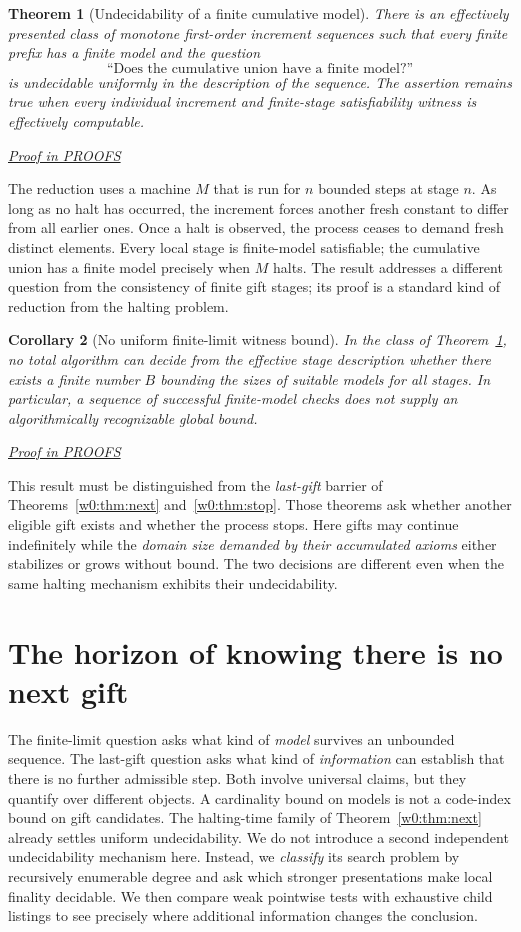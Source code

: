 \documentclass[11pt,letterpaper]{article}
\newtheorem{theorem}{Theorem}[section]
\newtheorem{corollary}[theorem]{Corollary}
\theoremstyle{definition}\newtheorem{definition}[theorem]{Definition}\newtheorem{example}[theorem]{Example}
\theoremstyle{remark}\newtheorem{remark}[theorem]{Remark}
\newcommand{\prooflink}[1]{\par\noindent\hfill\small\hyperref[#1]{\textit{Proof in PROOFS}}\normalsize}
\begin{document}
\begin{theorem}[Undecidability of a finite cumulative model]\label{w2:th:finundec}
There is an effectively presented class of monotone first-order increment sequences such that every finite prefix has a finite model and the question
\[
 \text{``Does the cumulative union have a finite model?''}
\]
is undecidable uniformly in the description of the sequence. The assertion remains true when every individual increment and finite-stage satisfiability witness is effectively computable.
\prooflink{w2:pr:finundec}
\end{theorem}

The reduction uses a machine $M$ that is run for $n$ bounded steps at stage $n$. As long as no halt has occurred, the increment forces another fresh constant to differ from all earlier ones. Once a halt is observed, the process ceases to demand fresh distinct elements. Every local stage is finite-model satisfiable; the cumulative union has a finite model precisely when $M$ halts. The result addresses a different question from the consistency of finite
gift stages; its proof is a standard kind of reduction from the halting
problem.

\begin{corollary}[No uniform finite-limit witness bound]\label{w2:co:bound}
In the class of Theorem~\ref{w2:th:finundec}, no total algorithm can decide from the effective stage description whether there exists a finite number $B$ bounding the sizes of suitable models for all stages. In particular, a sequence of successful finite-model checks does not supply an algorithmically recognizable global bound.
\prooflink{w2:pr:bound}
\end{corollary}

This result must be distinguished from the \emph{last-gift} barrier of
Theorems~\ref{w0:thm:next} and~\ref{w0:thm:stop}. Those theorems ask whether another eligible gift exists and whether the process stops. Here gifts may continue indefinitely while the \emph{domain size demanded by their accumulated axioms} either stabilizes or grows without bound. The two decisions are different even when the same halting mechanism exhibits their undecidability.


\section{The horizon of knowing there is no next gift}\label{sec:horizon-braid}
The finite-limit question asks what kind of \emph{model} survives an
unbounded sequence. The last-gift question asks what kind of \emph{information}
can establish that there is no further admissible step. Both involve
universal claims, but they quantify over different objects. A cardinality
bound on models is not a code-index bound on gift candidates. The halting-time family of Theorem~\ref{w0:thm:next} already settles
uniform undecidability. We do not introduce a second independent
undecidability mechanism here. Instead, we \emph{classify} its search
problem by recursively enumerable degree and ask which stronger
presentations make local finality decidable. We then compare weak
pointwise tests with exhaustive child listings to see precisely where
additional information changes the conclusion.
\end{document}
